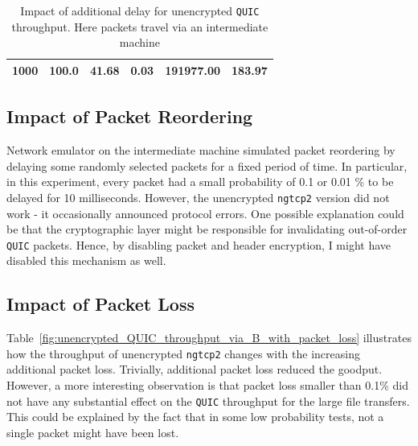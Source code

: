 \documentclass[12pt,a4paper]{report}
\begin{document}
\begin{table}[htbp]
\begin{tabular}{|l|l|l|l|l|l|}
1000                                                                                            & 100.0                                                                                                                  & 41.68                                                                                                                                      & 0.03                                                                                                                              & 191977.00                                                                                             & 183.97                                                                                                                                  \\ \hline
\end{tabular}
 \centering
    \caption[Impact of additional delay for unencrypted \texttt{QUIC} throughput]{Impact of additional delay for unencrypted \texttt{QUIC} throughput. Here packets travel via an intermediate machine}
    \label{fig:unencrypted_QUIC_throughput_via_B_with_packet_delay}
\end{table}


\subsection{Impact of Packet Reordering}
Network emulator on the intermediate machine simulated packet reordering by delaying some randomly selected packets for a fixed period of time. 
In particular, in this experiment, every packet had a small probability of 0.1 or 0.01 \% to be delayed for 10 milliseconds.
However, the unencrypted \texttt{ngtcp2} version did not work - it occasionally announced protocol errors.
One possible explanation could be that the cryptographic layer might be responsible for invalidating out-of-order \texttt{QUIC} packets.
Hence, by disabling packet and header encryption, I might have disabled this mechanism as well.


\subsection{Impact of Packet Loss}

Table~\ref{fig:unencrypted_QUIC_throughput_via_B_with_packet_loss} illustrates how the throughput of unencrypted \texttt{ngtcp2} changes with the increasing additional packet loss.
Trivially, additional packet loss reduced the goodput.
However, a more interesting observation is that packet loss smaller than 0.1\% did not have any substantial effect on the \texttt{QUIC} throughput for the large file transfers.
This could be explained by the fact that in some low probability tests, not a single packet might have been lost. 
\end{document}
